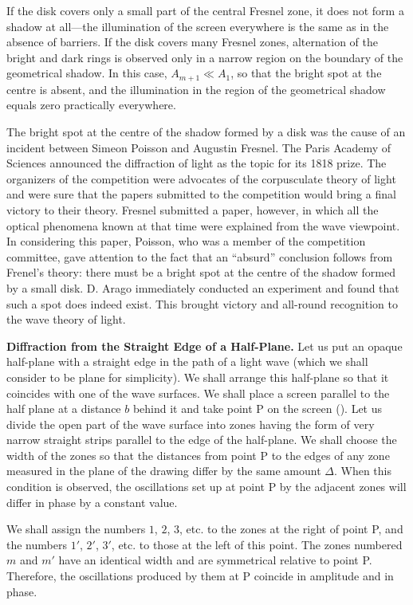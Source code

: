 If the disk covers only a small part of
 the central Fresnel zone, it does not form a shadow at all---the illumination of the screen everywhere is the same as in the absence of barriers.
If the disk covers many Fresnel zones, alternation of the bright and dark rings is observed only in a narrow region on the boundary of the geometrical shadow.
In this case, $A_{m+1}\ll A_1$, so that the bright spot at the centre is absent, and the illumination in the region of the geometrical shadow equals zero practically everywhere.

The bright spot at the centre of the shadow formed by a disk was the cause of an incident between Simeon Poisson and Augustin Fresnel.
The Paris Academy of Sciences announced the diffraction of light as the topic for its 1818 prize.
The organizers of the competition were advocates of the corpusculate theory of light and were sure that the papers submitted to the competition would bring a final victory to their theory.
Fresnel submitted a paper, however, in which all the optical phenomena known at that time were explained from the wave viewpoint.
In considering this paper, Poisson, who was a member of the competition committee, gave attention to the fact that an ``absurd'' conclusion follows from Frenel's theory: there must be a bright spot at the centre of the shadow formed by a small disk.
D. Arago immediately conducted an experiment and
found that such a spot does indeed exist.
This brought victory and all-round recognition to the wave theory of light.

\textbf{Diffraction from the Straight Edge of a Half-Plane.}
Let us put an opaque half-plane with a straight edge in the path of a light wave (which we shall consider to be plane for simplicity).
We shall arrange this half-plane so that it coincides with one of the wave surfaces.
We shall place a screen parallel to the half plane at a distance $b$ behind it and take point P on the screen ().
Let us divide the open part of the wave surface into zones having the form of very narrow straight strips parallel to the edge of the half-plane.
We shall choose the width of the zones so that the distances from point P to the edges of any zone measured in the plane of the drawing differ by the same amount $\Delta$.
When this condition is observed, the oscillations set up at point P by the adjacent zones will differ in phase by a constant value.

We shall assign the numbers $1$, $2$, $3$, etc. to the zones at the right of point P, and the numbers $1'$, $2'$, $3'$, etc. to those at the left of this point.
The zones numbered $m$ and $m'$ have an identical width and are symmetrical relative to point P.
Therefore, the oscillations produced by them at P coincide in amplitude and in phase.

